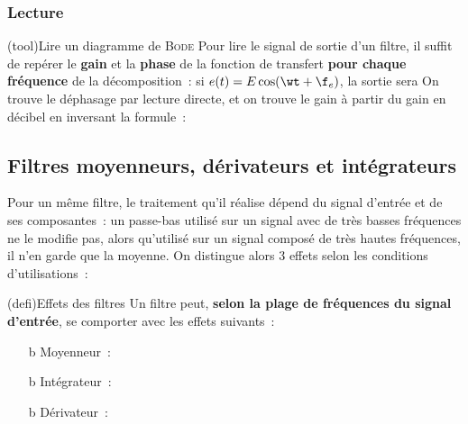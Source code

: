 \documentclass[../../main/main.tex]{subfiles}
\begin{document}
\subsubsection{Lecture}
\begin{tcb*}[breakable](tool){Lire un diagramme de \textsc{Bode}}
	Pour lire le signal de sortie d'un filtre, il suffit de repérer le \textbf{gain}
	et la \textbf{phase} de la fonction de transfert \textbf{pour chaque fréquence}
	de la décomposition~: si $e(t) = E \cos(\wt + \f_e)$, la sortie sera
	\psw{%
		\[
			s(t) = \abs{\Hu(\w)} E \cos(\wt + \f_e + \arg*{\Hu(\w)})
		\]
	}
	On trouve le déphasage par lecture directe, et on trouve le gain à partir du
	gain en décibel en inversant la formule~:
	\psw{%
		\[
			G\ind{dB}(\w) = 20 \log \abs{\Hu(\w)}
			\Lra
			\abs{\Hu(\w)} = 10^{G\ind{dB}(\w)/20}
		\]
	}
	\vspace{-15pt}
\end{tcb*}

\subsection{Filtres moyenneurs, dérivateurs et intégrateurs}
Pour un même filtre, le traitement qu'il réalise dépend du signal d'entrée et de
ses composantes~: un passe-bas utilisé sur un signal avec de très basses
fréquences ne le modifie pas, alors qu'utilisé sur un signal composé de très hautes
fréquences, il n'en garde que la moyenne. On distingue alors 3 effets selon les
conditions d'utilisations~:
\begin{tcb*}(defi){Effets des filtres}
	Un filtre peut, \textbf{selon la plage de fréquences du signal d'entrée}, se
	comporter avec les effets suivants~:
	\begin{itemize}
		\item[b]{Moyenneur}~:
		\item[b]{Intégrateur}~:
		\item[b]{Dérivateur}~:
	\end{itemize}
\end{tcb*}
\end{document}
